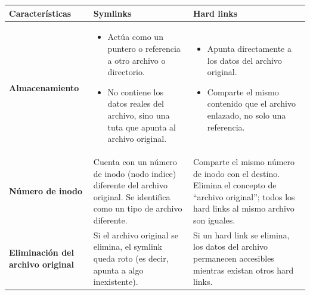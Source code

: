 \documentclass[
  spanish,
  12pt,
  letterpaper,
  DIV=11,
  numbers=noendperiod]{scrreprt}
\newcounter{none} %
\providecommand{\tightlist}{%
  \setlength{\itemsep}{0pt}\setlength{\parskip}{0pt}}
\begin{document}
{\def\LTcaptype{none} %
\begin{longtable}[]{@{}
  >{\raggedright\arraybackslash}p{}
  >{\raggedright\arraybackslash}p{}
  >{\raggedright\arraybackslash}p{}@{}}
\toprule\noalign{}
\begin{minipage}[b]{\linewidth}\raggedright
Características
\end{minipage} & \begin{minipage}[b]{\linewidth}\raggedright
Symlinks
\end{minipage} & \begin{minipage}[b]{\linewidth}\raggedright
Hard links
\end{minipage} \\
\midrule\noalign{}
\endhead
\bottomrule\noalign{}
\endlastfoot
\textbf{Almacenamiento} & \begin{minipage}[t]{\linewidth}\raggedright
\begin{itemize}
\tightlist
\item
  Actúa como un puntero o referencia a otro archivo o directorio.
\item
  No contiene los datos reales del archivo, sino una tuta que apunta al
  archivo original.
\end{itemize}
\end{minipage} & \begin{minipage}[t]{\linewidth}\raggedright
\begin{itemize}
\item
  Apunta directamente a los datos del archivo original.
\item
  Comparte el mismo contenido que el archivo enlazado, no solo una
  referencia.
\end{itemize}
\end{minipage} \\
\textbf{Número de inodo} & Cuenta con un número de inodo (nodo indice)
diferente del archivo original. Se identifica como un tipo de archivo
diferente. & Comparte el mismo número de inodo con el destino. Elimina
el concepto de ``archivo original''; todos los hard links al mismo
archivo son iguales. \\
\textbf{Eliminación del archivo original} & Si el archivo original se
elimina, el symlink queda roto (es decir, apunta a algo inexistente). &
Si un hard link se elimina, los datos del archivo permanecen accesibles
mientras existan otros hard links. \\

\end{longtable}}
\end{document}
